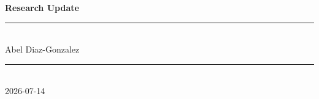 \newcommand{\updatedate}{2026-07-14} 
\newcommand{\myDynamicPath}{update-\updatedate/main.tex}




\begin{frame}[plain]
  \vfill
  \begin{center}
    {\Huge\bfseries\color{DeepBlue} Research Update}\\[0.7em]
    {\color{SkyBlue}\rule{0.35\linewidth}{1.6pt}}\\[0.7em]
    {\Large\color{SkyBlue}Abel Diaz-Gonzalez}\\
    {\color{SkyBlue}\rule{0.35\linewidth}{1.6pt}}\\[1.4em]
    {\large\color{DeepBlue!80!black} \updatedate}
  \end{center}
  \vfill
\end{frame}




